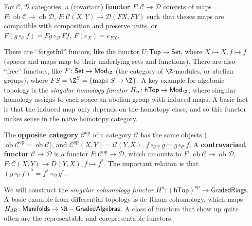 \begin{definition}[Functors]
    For $\mathcal{C,D} $ categories, a (covariant) \textbf{functor} $F \colon \mathcal{C}  \to \mathcal{D} $ consists of maps $F \colon \operatorname{ob}\mathcal{C}  \to \operatorname{ob}\mathcal{D} $, $F \colon \mathcal{C} (X,Y) \to \mathcal{D} (FX,FY)$ such that theses maps are compatible with composition and preserve units, or $F(g \circ _{\mathcal{C} }f)=Fg \circ _{\mathcal{D} }Ff,\ F(e_X)=e_{FX}$.
\end{definition}
\begin{example}
    There are ``forgetful'' funtors, like the functor $U \colon \mathsf{Top}  \to \mathsf{Set} $, where $X \mapsto  X, f \mapsto f$ (spaces and maps map to their underlying sets and functions). There are also ``free'' functors, like $F \colon \mathsf{Set}  \to \mathsf{Mod} _{\Z}$ (the category of $\Z$-modules, or abelian groups), where $FS=\Z^S= \{\text{maps}\ S \to \Z \} $. A key example for algebraic topology is the \emph{singular homology functor} $H_n  \colon \mathsf{hTop}  \to \mathsf{Mod}_{\Z} $, where singular homology assigns to each space an abelian group with induced maps. A basic fact is that the induced map only depends on the homotopy class, and so this functor makes sense in the na\"ive homotopy category.
\end{example}
\begin{definition}[]
    The \textbf{opposite category} $\mathcal{C} ^{\mathrm{op}}$ of a category $\mathcal{C} $ has the same objects ($\operatorname{ob}\mathcal{C} ^{\mathrm{op}}=\operatorname{ob}\mathcal{C} $), and $\mathcal{C} ^{\mathrm{op}}(X,Y)=\mathcal{C} (Y,X)$, $f \circ _{\mathcal{C} ^{\mathrm{op}}}g=g \circ _{\mathcal{C} }f$. A \textbf{contravariant functor} $\mathcal{C} \to \mathcal{D} $ is a functor $F \colon \mathcal{C} ^{\mathrm{op}} \to \mathcal{D} $, which amounts to $F \colon \operatorname{ob}\mathcal{C}  \to \operatorname{ob}\mathcal{D} $, $F \colon \mathcal{C} (X,Y) \to D(Y,X), f \mapsto f^*$. The important relation is that $(g \circ _{\mathcal{C} }f)^*=f^* \circ _{\mathcal{D} }g^*$.
\end{definition}
We will construct the \emph{singular cohomology functor} $H^n  \colon (\mathsf{hTop}  )^{\mathrm{op}}\to \mathsf{GradedRings} $. A basic example from differential topology is de Rham cohomology, which maps $H_{dR}\colon \mathsf{Manifolds} \to \R-\mathsf{GradedAlgebras} $. A class of functors that show up quite often are the representable and corepresentable functors.

